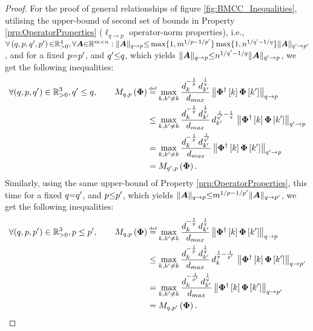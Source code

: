 \begin{proof}
For the proof of general relationships of figure \ref{fig:BMCC_Inequalities}, utilising the upper-bound of second set of bounds in Property \ref{prp:OperatorProperties} ($\ell_{q {\to} p}$ operator-norm properties), i.e., $\forall \left( q , p , q' , p' \right) {\in} \mathbb{R}^4_{>0} , \forall \boldsymbol{A} {\in} \mathbb{R}^{m {\times} n} : \Vert \boldsymbol{A} \Vert_{q \to p} {\leq} \max \{1 , m^{1/p {-} 1/{p'}} \} \max \{1 , n^{1/{q'} {-} 1/q} \} \Vert \boldsymbol{A} \Vert_{q' \to p'}$, and for a fixed $p {=} p'$, and $q' {\leq} q$, which yields $\Vert \boldsymbol{A} \Vert_{q \to p} {\leq} n^{1/{q'} {-} 1/q} \Vert \boldsymbol{A} \Vert_{q' \to p}$, we get the following inequalities:
\begin{equation*}
\begin{aligned}
\forall (q , p , q') \in \mathbb{R}^3_{>0}, q' \leq q, \qquad
M_{q,p}\myparanthese{\myPhi} 
&\myeq \max_{k,k' \neq k} \frac{d_{k}^{-\frac1p} \, d_{k'}^{\frac1q}}{d_{max}} \mynorm{\myPhi^\dagger\mybracket{k} \myPhi \mybracket{k'}}_{q \to p} \\
&\leq \max_{k,k' \neq k} \frac{d_{k}^{-\frac1p} \, d_{k'}^{\frac1q}}{d_{max}} \, d_{k'}^{\frac{1}{q'} - \frac1q} \, \mynorm{\myPhi^\dagger\mybracket{k} \myPhi \mybracket{k'}}_{q' \to p} \\
&= \max_{k,k' \neq k} \frac{d_{k}^{-\frac1p} \, d_{k'}^{\frac{1}{q'}}}{d_{max}} \mynorm{\myPhi^\dagger\mybracket{k} \myPhi \mybracket{k'}}_{q' \to p} \\
&= M_{q',p}\myparanthese{\myPhi}.
\end{aligned}
\end{equation*}
Similarly, using the same upper-bound of Property \ref{prp:OperatorProperties}, this time for a fixed $q {=} q'$, and $p {\leq} p'$, which yields $\Vert \boldsymbol{A} \Vert_{q \to p} {\leq} m^{1/p {-} 1/{p'}} \Vert \boldsymbol{A} \Vert_{q \to p'}$, we get the following inequalities:
\begin{equation*}
\begin{aligned}
\forall (q , p , p') \in \mathbb{R}^3_{>0}, p \leq p', \qquad
M_{q,p}\myparanthese{\myPhi} 
&\myeq \max_{k,k' \neq k} \frac{d_{k}^{-\frac1p} \, d_{k'}^{\frac1q}}{d_{max}} \mynorm{\myPhi^\dagger\mybracket{k} \myPhi \mybracket{k'}}_{q \to p} \\
&\leq \max_{k,k' \neq k} \frac{d_{k}^{-\frac1p} \, d_{k'}^{\frac1q}}{d_{max}} \, d_{k}^{\frac1p - \frac{1}{p'}} \, \mynorm{\myPhi^\dagger\mybracket{k} \myPhi \mybracket{k'}}_{q \to p'} \\
&= \max_{k,k' \neq k} \frac{d_{k}^{-\frac{1}{p'}} \, d_{k'}^{\frac1q}}{d_{max}} \mynorm{\myPhi^\dagger\mybracket{k} \myPhi \mybracket{k'}}_{q \to p'} \\
&= M_{q,p'}\myparanthese{\myPhi}.
\end{aligned}
\end{equation*}
\end{proof}